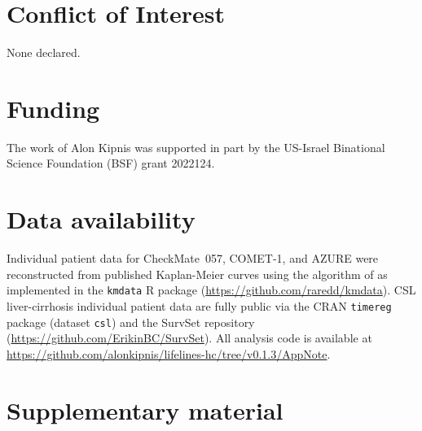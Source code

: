 \documentclass[11pt]{article}
\begin{document}


\section*{Conflict of Interest}
None declared.

\section*{Funding}
The work of Alon Kipnis was supported in part by the US-Israel Binational Science Foundation (BSF) grant 2022124.

\section*{Data availability}
Individual patient data for CheckMate~057, COMET-1, and AZURE were
reconstructed from published Kaplan-Meier curves using the algorithm of
\citet{guyot2012} as implemented in the \texttt{kmdata} R package
(\url{https://github.com/raredd/kmdata}). CSL liver-cirrhosis individual
patient data are fully public via the CRAN \texttt{timereg} package
(dataset \texttt{csl}) and the SurvSet repository \citep{survset2022}
(\url{https://github.com/ErikinBC/SurvSet}).
All analysis code is available at
\url{https://github.com/alonkipnis/lifelines-hc/tree/v0.1.3/AppNote}.






\appendix
\section*{Supplementary material}
\renewcommand{\thesection}{S\arabic{section}}
\setcounter{section}{0}
\renewcommand{\thetable}{S\arabic{table}}
\setcounter{table}{0}
\end{document}
